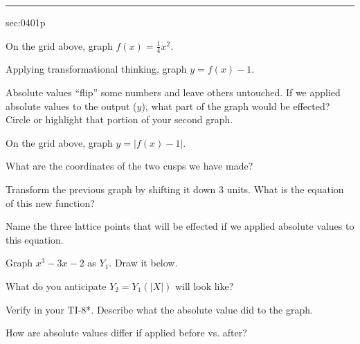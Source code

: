 \renewcommand{\columnseprule}{1.5pt}
\begin{multicols*}{2}
\rule[0.5\baselineskip]{0.4\textwidth}{1pt}
\noindent
{}\label{sec:0401p}
\begin{exercises}{sec:0401p}

\lab{} On the grid above, graph $f(x)= \frac{1}{4}x^2$.

\lab{}  Applying transformational thinking, graph $y=f(x)-1$.

\lab{}  Absolute values ``flip'' some numbers and leave others untouched.  If we applied absolute values to the output ($y$), what part of the graph would be effected?  Circle or highlight that portion of your second graph.

\noindent
{}

\lab{}  On the grid above, graph $y=|f(x)-1|$.

\lab{}  What are the coordinates of the two cusps we have made?

\vspace{2cm}
\lab{}  Transform the previous graph by shifting it down 3 units.  What is the equation of this new function?

\vspace{2cm}
\lab{}  Name the three lattice points that will be effected if we applied absolute values to this equation.

\vspace{2cm}
\lab{}  Graph $x^3-3x-2$ as $Y_1$.  Draw it below.

\noindent
{}

\lab{}  What do you anticipate $Y_2=Y_1(|X|)$ will look like?

\vspace{2cm}
\lab{}  Verify in your TI-8*.  Describe what the absolute value did to the graph.


\vspace{2cm}
\lab{} How are absolute values differ if applied before vs. after?


\end{exercises}
\end{multicols*}